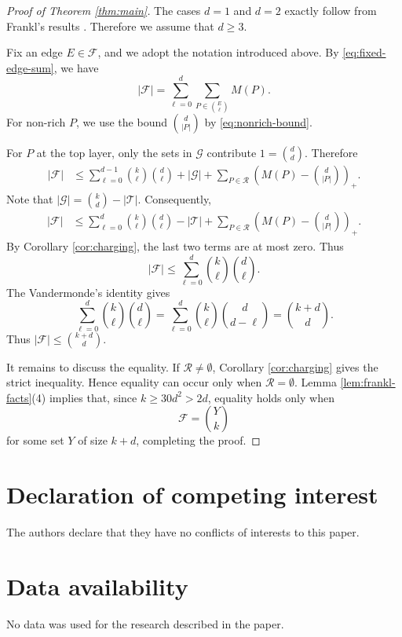 \documentclass[11pt]{article}
\numberwithin{equation}{section}
\begin{document}
\begin{proof}[Proof of Theorem \ref{thm:main}]
	The cases $d=1$ and $d=2$ exactly follow from Frankl's results \cite{FranklCritical}.  Therefore we assume that $d\ge 3$.
	
	Fix an edge $E\in\mathcal F$, and we adopt the notation introduced above.  By \eqref{eq:fixed-edge-sum}, we have
	\[
	|\mathcal F|
	=
	\sum_{\ell=0}^{d}\sum_{P\in\binom{E}{\ell}} M(P).
	\]
	For non-rich $P$, we use the bound $\binom{d}{|P|}$ by \eqref{eq:nonrich-bound}.


For $P$ at the top layer, only the sets in $\mathcal G$ contribute $1=\binom{d}{d}$.  Therefore
	\begin{align*}
		|\mathcal F|
		&\le
		\sum_{\ell=0}^{d-1}\binom{k}{\ell}\binom{d}{\ell}
		+|\mathcal G|
		+
		\sum_{P\in\mathcal R}
		\left(M(P)-\binom{d}{|P|}\right)_+ .
	\end{align*}
	Note that
	$
	|\mathcal G|=\binom{k}{d}-|\mathcal{T}|.
	$
	Consequently,
	\begin{align*}
		|\mathcal F|
		&\le
		\sum_{\ell=0}^{d}\binom{k}{\ell}\binom{d}{\ell}
		-|\mathcal{T}|
		+
		\sum_{P\in\mathcal R}
		\left(M(P)-\binom{d}{|P|}\right)_+ .
	\end{align*}
	By Corollary \ref{cor:charging}, the last two terms are at most zero.  Thus
	\[
	|\mathcal F|
	\le
	\sum_{\ell=0}^{d}\binom{k}{\ell}\binom{d}{\ell}.
	\]
	The Vandermonde's identity gives
	\[
	\sum_{\ell=0}^{d}\binom{k}{\ell}\binom{d}{\ell}
	=
	\sum_{\ell=0}^{d}\binom{k}{\ell}\binom{d}{d-\ell}
	=
	\binom{k+d}{d}.
	\]
	Thus
	$
	|\mathcal F|\le \binom{k+d}{d}.
	$
	
	It remains to discuss the equality.  If $\mathcal R\ne\emptyset$, Corollary \ref{cor:charging} gives the strict inequality.  Hence equality can occur only when $\mathcal R=\emptyset$.  Lemma \ref{lem:frankl-facts}(4) implies that, since $k\ge 30d^2>2d$, equality holds only when
	\[
	\mathcal F=\binom{Y}{k}
	\]
	for some set $Y$ of size $k+d$,
	completing the proof.
\end{proof}

	
	
	
	
	
	
	\section*{Declaration of competing interest}
	The authors declare that they have no conflicts of interests to this paper.
	
	\section*{Data availability}
	No data was used for the research described in the paper.
	
\end{document}
